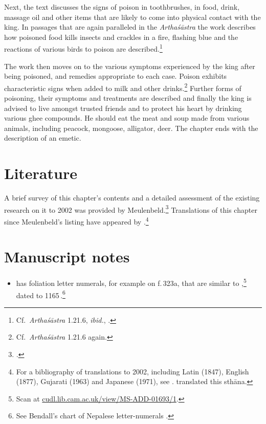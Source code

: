 Next, the text discusses the signs of poison in toothbrushes, in food, drink,
massage oil and other items that are likely to come into physical contact with the
king.  In passages that are again paralleled in the \emph{Arthaśāstra} the work
describes how poisoned food kills insects and crackles in a fire, flashing blue
and  the reactions of various birds to poison are described.\footnote{Cf.\
\emph{Arthaśāstra} 1.21.6, \emph{ibid.}, \citet[96]{oliv-2013}.}


The work then moves on to the various symptoms experienced by the king after 
being poisoned, and remedies appropriate to each case.  Poison exhibits 
characteristic signs when added to milk and other drinks.\footnote{Cf.\
\emph{Arthaśāstra} 1.21.6 again.} Further forms of poisoning, their symptoms 
and treatments are described  and finally the king is advised to live amongst 
trusted friends and to protect his heart by drinking various ghee compounds.  He 
should eat the meat and soup made from various animals, including peacock, 
mongoose, alligator, deer.  The chapter ends with the description of an emetic.

\section{Literature}

A brief survey of this chapter's contents and a detailed assessment of
the existing research on it to 2002 was provided by
Meulenbeld.\footcite[IA, 289--290]{meul-hist} Translations of this
chapter since Meulenbeld's listing have appeared by
\textcites[131--139]{wuja-2003}[3,
1--15]{shar-1999}{srik-2002}.\footnote{For a bibliography of translations
    to 2002, including Latin (1847), English (1877), Gujarati (1963) and
    Japanese (1971), see \cite[IB, 314--315]{meul-hist}. \citet{sing-1976} 
    translated this sthāna.}


\section{Manuscript notes}

\begin{itemize}
    \item {} has foliation letter numerals, for example
on f.\,323a, that are similar to \MScite{Cambridge CUL 
Add.1693},\footnote{Scan
at 
\href{https://cudl.lib.cam.ac.uk/view/MS-ADD-01693/1}
{cudl.lib.cam.ac.uk/view/MS-ADD-01693/1}.}
 dated to 1165\,\CE.\footnote{See Bendall's chart of Nepalese 
 letter-numerals \citep[Lithograph V, 
after p.\,225]{bend-budd}.}
\end{itemize}

